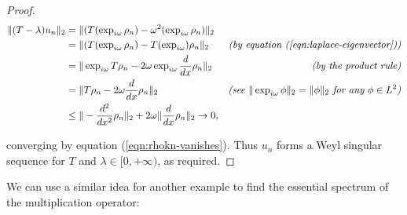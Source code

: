 \documentclass{article}
\newcommand{\1}{\mathbf{1}}
\begin{document}
\begin{proof}
\begin{align*}
\|(T - \lambda)u_n\|_2 & = \|(T(\exp_{i \omega} \rho_n) - \omega^2(\exp_{i \omega} \rho_n)\|_2 & \\
& = \|(T(\exp_{i \omega} \rho_n) - T(\exp_{i \omega}) \rho_n\|_2 & \text{\emph{(by equation (\ref{eqn:laplace-eigenvector}))}} \\
& =\|\exp_{i \omega} T\rho_n - 2 \omega \exp_{i \omega} \frac{d}{dx}\rho_n\|_2 & \text{\emph{(by the product rule)}} \\
& = \|T\rho_n - 2 \omega \frac{d}{dx}\rho_n\|_2 & \text{\emph{(see $\|\exp_{i \omega} \phi\|_2 = \|\phi\|_2$ for any $\phi \in L^2$)}} \\
& \leq  \|-\frac{d^2}{dx^2}\rho_n\|_2 + 2\omega\|\frac{d}{dx}\rho_n\|_2 \rightarrow 0, & 
\end{align*}

converging by equation (\ref{eqn:rhokn-vanishes}).
Thus $u_n$ forms a Weyl singular sequence for $T$ and $\lambda \in [0, +\infty)$, as required.
\end{proof}

We can use a similar idea for another example to find the essential spectrum of the multiplication operator:
\end{document}
